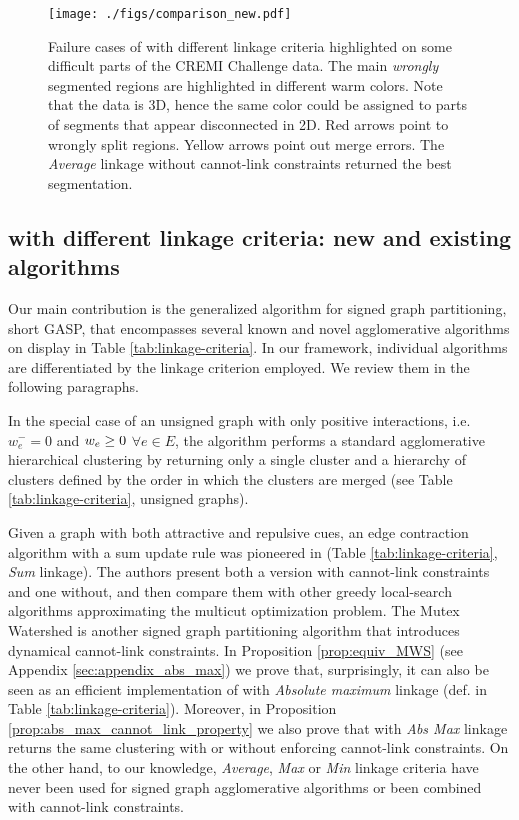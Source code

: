 \begin{figure}
\centering
\texttt{[image: ./figs/comparison\_new.pdf]} %
\caption{Failure cases of \algname{} with different linkage criteria highlighted on some difficult parts of the CREMI Challenge data. The main \emph{wrongly} segmented regions are highlighted in different warm colors. Note that the data is 3D, hence the same color could be assigned to parts of segments that appear disconnected in 2D.  Red arrows point to wrongly split regions. Yellow arrows point out merge errors. The \emph{Average} linkage without cannot-link constraints returned the best segmentation.
\label{fig:cremi_comparison}}
\end{figure}



\subsection{\algname{} with different linkage criteria: new and existing algorithms} \label{sec:alg_update_rules}

Our main contribution is the generalized algorithm for signed graph partitioning, short GASP, that encompasses several known and novel agglomerative algorithms on display in Table \ref{tab:linkage-criteria}.
In our framework, individual algorithms are differentiated by the linkage criterion employed. We review them in the following paragraphs.

In the special case of an unsigned graph with only positive interactions, i.e. $w_e^-=0$ and $w_e \geq 0$ $\forall e\in E$, 
 the algorithm performs a standard agglomerative hierarchical clustering by returning only a single cluster and a hierarchy of clusters defined by the order in which the clusters are merged (see Table \ref{tab:linkage-criteria}, unsigned graphs).

Given a graph with both attractive and repulsive cues, an edge contraction algorithm with a sum update rule was pioneered in \cite{levinkov2017comparative,keuper2015efficient} (Table \ref{tab:linkage-criteria}, \emph{Sum} linkage). The authors present both a version with cannot-link constraints and one without, and then compare them with other greedy local-search algorithms approximating the multicut optimization problem.
The Mutex Watershed \cite{wolf2018mutex} is another signed graph partitioning algorithm that introduces dynamical cannot-link constraints. In Proposition \ref{prop:equiv_MWS} (see Appendix \ref{sec:appendix_abs_max}) we prove that, surprisingly, it can also be seen as an efficient implementation of \algname{} with \emph{Absolute maximum} linkage (def. in Table \ref{tab:linkage-criteria}). Moreover, in Proposition \ref{prop:abs_max_cannot_link_property} we also prove that \algname{} with \emph{Abs Max} linkage returns the same clustering with or without enforcing cannot-link constraints.
On the other hand, to our knowledge, \emph{Average}, \emph{Max} or \emph{Min} linkage criteria have never been used for signed graph agglomerative algorithms or been combined with cannot-link constraints.

